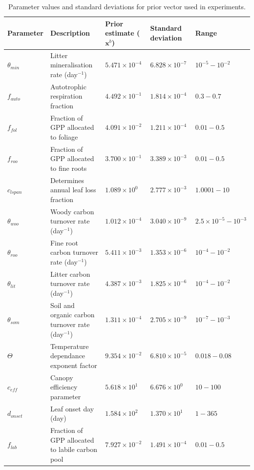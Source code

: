 \documentclass[draft,linenumbers]{agujournal}
\begin{document}
\begin{table}[ht] 
	\caption{Parameter values and standard deviations for prior vector used in experiments.}
\begin{center}
\scriptsize
	\begin{tabular}{| l | p{4.5cm} | p{1.7cm} | p{1.7cm} | p{1.7cm} |}
	\hline
	Parameter & Description & Prior estimate ($\textbf{x}^{b}$) & Standard deviation & Range \\ \hline
$\theta_{min}$ & Litter mineralisation rate (day$^{-1}$) & $5.471\times 10^{-4}$ & $6.828\times 10^{-7}$ & $10^{-5} - 10^{-2}$ \\ \hline
$f_{auto}$ & Autotrophic respiration fraction & $4.492\times 10^{-1}$ & $1.814\times 10^{-4}$ & $0.3 - 0.7$  \\ \hline
$f_{fol}$ & Fraction of GPP allocated to foliage & $4.091\times 10^{-2}$ & $1.211\times 10^{-4}$ & $0.01-0.5$ \\ \hline
$f_{roo}$ & Fraction of GPP allocated to fine roots & $3.700\times 10^{-1}$ & $3.389\times 10^{-3}$ & $0.01-0.5$ \\ \hline
$c_{lspan}$ & Determines annual leaf loss fraction & $1.089\times 10^{0} $ & $2.777\times 10^{-3}$ & $1.0001 - 10$ \\ \hline
$\theta_{woo}$ & Woody carbon turnover rate (day$^{-1}$) & $1.012\times 10^{-4}$ & $3.040\times 10^{-9}$ & $2.5\times10^{-5} - 10^{-3}$ \\ \hline
$\theta_{roo}$ & Fine root carbon turnover rate (day$^{-1}$) & $5.411\times 10^{-3}$ & $1.353\times 10^{-6}$ & $10^{-4} - 10^{-2}$ \\ \hline
$\theta_{lit}$ & Litter carbon turnover rate (day$^{-1}$) & $4.387\times 10^{-3}$ & $1.825\times 10^{-6}$ & $10^{-4} - 10^{-2}$ \\ \hline
$\theta_{som}$ & Soil and organic carbon turnover rate (day$^{-1}$) & $1.311\times 10^{-4}$ & $2.705\times 10^{-9}$ & $10^{-7} - 10^{-3}$ \\ \hline
$\Theta$ & Temperature dependance exponent factor & $9.354\times 10^{-2}$ & $6.810\times 10^{-5}$ & $0.018 - 0.08$ \\ \hline
$c_{eff}$ & Canopy efficiency parameter & $5.618\times 10^{1}$ & $6.676\times 10^{0}$ & $10 - 100$ \\ \hline
$d_{onset}$ & Leaf onset day (day) & $1.584\times 10^{2}$ & $1.370\times 10^{1}$ & $1 - 365$ \\ \hline
$f_{lab}$ & Fraction of GPP allocated to labile carbon pool & $7.927\times 10^{-2}$ & $1.491\times 10^{-4}$ & $0.01 - 0.5$ \\ \hline

\end{tabular}
\end{center}
\end{table}
\end{document}
